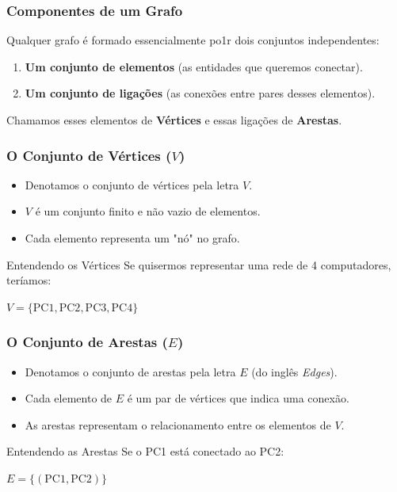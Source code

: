 \documentclass[9pt]{beamer}
\begin{document}
\begin{frame}
    \frametitle{Componentes de um Grafo}
    Qualquer grafo é formado essencialmente po1r dois conjuntos independentes:
    \vspace{0.5cm}
    \begin{enumerate}
        \item \textbf{Um conjunto de elementos} (as entidades que queremos conectar).
        \item \textbf{Um conjunto de ligações} (as conexões entre pares desses elementos).
    \end{enumerate}
    \vspace{0.5cm}
    Chamamos esses elementos de \textbf{Vértices} e essas ligações de \textbf{Arestas}.
\end{frame}

\begin{frame}
    \frametitle{O Conjunto de Vértices ($V$)}
    \begin{itemize}
        \item Denotamos o conjunto de vértices pela letra \textbf{$V$}.
        \item $V$ é um conjunto finito e não vazio de elementos.
        \item Cada elemento representa um "nó" no grafo.
    \end{itemize}
    \vspace{0.5cm}
    \begin{block}{Entendendo os Vértices}
        Se quisermos representar uma rede de 4 computadores, teríamos:
        \begin{center}
            $V = \{ \text{PC1}, \text{PC2}, \text{PC3}, \text{PC4} \}$
        \end{center}
    \end{block}
\end{frame}

\begin{frame}
    \frametitle{O Conjunto de Arestas ($E$)}
    \begin{itemize}
        \item Denotamos o conjunto de arestas pela letra \textbf{$E$} (do inglês \textit{Edges}).
        \item Cada elemento de $E$ é um par de vértices que indica uma conexão.
        \item As arestas representam o relacionamento entre os elementos de $V$.
    \end{itemize}
    \vspace{0.5cm}
    \begin{block}{Entendendo as Arestas}
        Se o PC1 está conectado ao PC2:
        \begin{center}
            $E = \{ (\text{PC1}, \text{PC2}) \}$
        \end{center}
    \end{block}
\end{frame}
\end{document}

